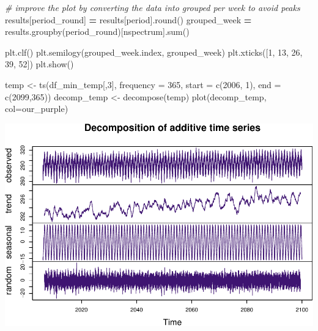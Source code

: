 \documentclass[
  paper=a4,
  ,captions=tableheading
]{scrartcl}
\newenvironment{Shaded}{\begin{snugshade}}{\end{snugshade}}
\newcommand{\AttributeTok}[1]{\textcolor[rgb]{0.77,0.63,0.00}{#1}}
\newcommand{\BuiltInTok}[1]{#1}
\newcommand{\CommentTok}[1]{\textcolor[rgb]{0.56,0.35,0.01}{\textit{#1}}}
\newcommand{\DecValTok}[1]{\textcolor[rgb]{0.00,0.00,0.81}{#1}}
\newcommand{\FunctionTok}[1]{\textcolor[rgb]{0.00,0.00,0.00}{#1}}
\newcommand{\NormalTok}[1]{#1}
\newcommand{\OperatorTok}[1]{\textcolor[rgb]{0.81,0.36,0.00}{\textbf{#1}}}
\newcommand{\OtherTok}[1]{\textcolor[rgb]{0.56,0.35,0.01}{#1}}
\newcommand{\StringTok}[1]{\textcolor[rgb]{0.31,0.60,0.02}{#1}}
\begin{document}
\begin{Shaded}
\begin{Highlighting}[]
\CommentTok{\# improve the plot by converting the data into grouped per week to avoid peaks}
\NormalTok{results[}\StringTok{\textquotesingle{}period\_round\textquotesingle{}}\NormalTok{] }\OperatorTok{=}\NormalTok{ results[}\StringTok{\textquotesingle{}period\textquotesingle{}}\NormalTok{].}\BuiltInTok{round}\NormalTok{()}
\NormalTok{grouped\_week }\OperatorTok{=}\NormalTok{ results.groupby(}\StringTok{\textquotesingle{}period\_round\textquotesingle{}}\NormalTok{)[}\StringTok{\textquotesingle{}nspectrum\textquotesingle{}}\NormalTok{].}\BuiltInTok{sum}\NormalTok{()}

\NormalTok{plt.clf()}
\NormalTok{plt.semilogy(grouped\_week.index, grouped\_week)}
\NormalTok{plt.xticks([}\DecValTok{1}\NormalTok{, }\DecValTok{13}\NormalTok{, }\DecValTok{26}\NormalTok{, }\DecValTok{39}\NormalTok{, }\DecValTok{52}\NormalTok{])}
\NormalTok{plt.show()}
\end{Highlighting}
\end{Shaded}

\begin{Shaded}
\begin{Highlighting}[]
\NormalTok{temp }\OtherTok{\textless{}{-}} \FunctionTok{ts}\NormalTok{(df\_min\_temp[,}\DecValTok{3}\NormalTok{], }\AttributeTok{frequency =} \DecValTok{365}\NormalTok{, }\AttributeTok{start =} \FunctionTok{c}\NormalTok{(}\DecValTok{2006}\NormalTok{, }\DecValTok{1}\NormalTok{), }\AttributeTok{end =} \FunctionTok{c}\NormalTok{(}\DecValTok{2099}\NormalTok{,}\DecValTok{365}\NormalTok{))}
\NormalTok{decomp\_temp }\OtherTok{\textless{}{-}} \FunctionTok{decompose}\NormalTok{(temp)}
\FunctionTok{plot}\NormalTok{(decomp\_temp, }\AttributeTok{col=}\NormalTok{our\_purple)}
\end{Highlighting}
\end{Shaded}

\includegraphics{Haskell_files/figure-latex/unnamed-chunk-57-1.pdf}
\end{document}
